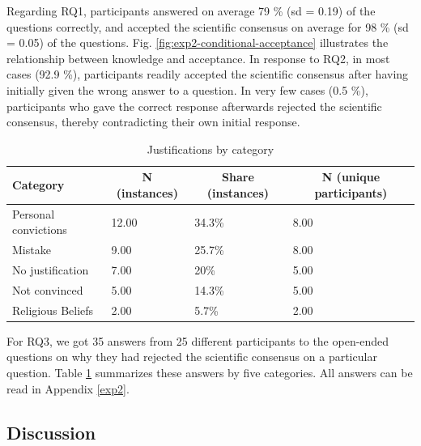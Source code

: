 \documentclass[
  doc,floatsintext]{apa6}
\begin{document}
Regarding RQ1, participants answered on average 79 \% (sd = 0.19) of the questions correctly, and accepted the scientific consensus on average for 98 \% (sd = 0.05) of the questions. Fig. \ref{fig:exp2-conditional-acceptance} illustrates the relationship between knowledge and acceptance. In response to RQ2, in most cases (92.9 \%), participants readily accepted the scientific consensus after having initially given the wrong answer to a question. In very few cases (0.5 \%), participants who gave the correct response afterwards rejected the scientific consensus, thereby contradicting their own initial response.

\begin{table}[tbp]

\begin{center}
\begin{threeparttable}

\caption{\label{tab:exp2-justifications}Justifications by category}

\begin{tabular}{llll}
\toprule
Category & \multicolumn{1}{c}{N (instances)} & \multicolumn{1}{c}{Share (instances)} & \multicolumn{1}{c}{N (unique participants)}\\
\midrule
Personal convictions & 12.00 & 34.3\% & 8.00\\
Mistake & 9.00 & 25.7\% & 8.00\\
No justification & 7.00 & 20\% & 5.00\\
Not convinced & 5.00 & 14.3\% & 5.00\\
Religious Beliefs & 2.00 & 5.7\% & 2.00\\
\bottomrule
\end{tabular}

\end{threeparttable}
\end{center}

\end{table}

For RQ3, we got 35 answers from 25 different participants to the open-ended questions on why they had rejected the scientific consensus on a particular question. Table \ref{tab:exp2-justifications} summarizes these answers by five categories. All answers can be read in Appendix \ref{exp2}.

\subsection{Discussion}\label{discussion-2}
\end{document}
